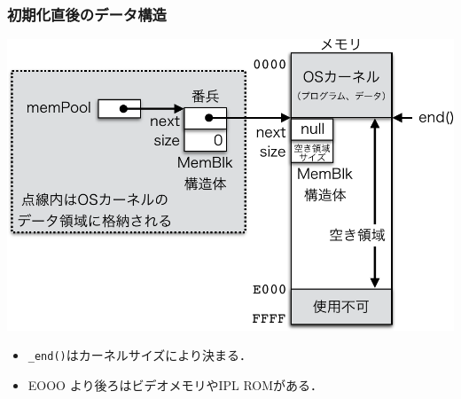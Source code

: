 \documentclass{beamer}                   %
\begin{document}
\begin{frame}
  \frametitle{初期化直後のデータ構造}
  \begin{center}
    \includegraphics[scale=0.6]{Fig/mmInit-crop.pdf}\\
  \end{center}
  \begin{itemize}
  \item {\tt \_end()}はカーネルサイズにより決まる．
  \item EOOO より後ろはビデオメモリやIPL ROMがある．
  \end{itemize}
\end{frame}
\end{document}
